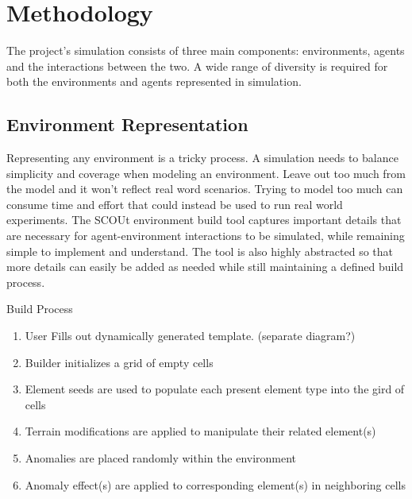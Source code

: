 \documentclass[]{report}
\begin{document}
\chapter{Methodology}
The project’s simulation consists of three main components: environments, agents and the interactions between the two.
A wide range of diversity is required for both the environments and agents represented in simulation.


\section{Environment Representation}
Representing any environment is a tricky process.
A simulation needs to balance simplicity and coverage when modeling an environment.
Leave out too much from the model and it won’t reflect real word scenarios.
Trying to model too much can consume time and effort that could instead be used to run real world experiments.
The SCOUt environment build tool captures important details that are necessary for agent-environment interactions to be simulated, while remaining simple to implement and understand.
The tool is also highly abstracted so that more details can easily be added as needed while still maintaining a defined build process.

Build Process
\begin{enumerate}
  \item User Fills out dynamically generated template. (separate diagram?)
  \item	Builder initializes a grid of empty cells
  \item	Element seeds are used to populate each present element type into the gird of cells
  \item	Terrain modifications are applied to manipulate their related element(s)
  \item	Anomalies are placed randomly within the environment
  \item	Anomaly effect(s) are applied to corresponding element(s) in neighboring cells
\end{enumerate}
\end{document}
